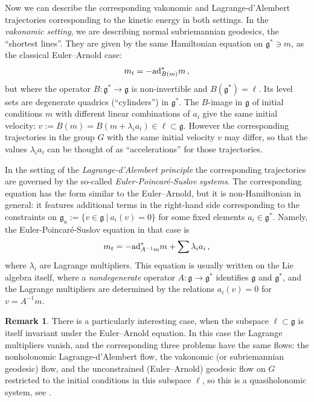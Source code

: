 \documentclass[11pt]{article}
\theoremstyle{definition}
\newtheorem{remark}[lemma]{Remark}
\newcounter{ai}
\begin{document}
Now we can describe the corresponding vakonomic and  Lagrange-d'Alembert trajectories corresponding to the 
kinetic energy in both settings.
In the {\it vakonomic setting}, we are describing normal subriemannian geodesics, the  ``shortest lines''. They are given by the same Hamiltonian equation on $\mathfrak{g}^*\ni m$, as the classical Euler--Arnold case:
$$
 m_t= -{\rm ad}^*_{B(m)}m\,,
 $$
 but where the operator $B: \mathfrak{g}^*\to\mathfrak{g}$ is non-invertible and $B(\mathfrak{g}^*)=\ell$.
 Its level sets are degenerate quadrics (``cylinders'') in $\mathfrak{g}^*$. The $B$-image in $\mathfrak{g}$ 
  of initial conditions $m$  with different linear combinations of $a_i$ give the same initial velocity:
  $v:=B(m)=B(m+\lambda_ia_i)\in \ell\subset \mathfrak{g}$. However the corresponding trajectories in the group $G$
 with the same initial velocity $v$ may differ, so that the values $\lambda_i a_i$ can be thought of as ``accelerations'' for those trajectories.
 
 \medskip
 

In the setting of the {\it Lagrange-d'Alembert principle} the corresponding trajectories are governed 
by the so-called {\it Euler-Poincar\'e-Suslov systems}. The corresponding equation has the form similar to the 
Euler--Arnold, but it is non-Hamiltonian in general: it features additional  terms in the right-hand side 
corresponding to the constraints on  $\mathfrak{g}_a:=\{v\in \mathfrak{g}~|~a_i(v)=0\}$ 
for some fixed elements $ a_i\in  \mathfrak{g}^*$. Namely, the Euler-Poincar\'e-Suslov equation 
in that case is
$$
    m_t= -{\rm ad}^*_{A^{-1}m}m+\sum\lambda_i a_i\,,
$$
where $\lambda_i$ are Lagrange multipliers.
This equation is usually written on the Lie algebra itself, where a {\it nondegenerate} operator $A:\mathfrak{g}\to \mathfrak{g}^*$ identifies $\mathfrak{g}$ and $\mathfrak{g}^*$, and  the Lagrange multipliers are determined by the relations $a_i(v)=0$ for $v=A^{-1}m$.

\begin{remark}\label{rem:coincide}
There is a particularly interesting case, when the subspace $\ell\subset \mathfrak{g}$
is itself invariant under the Euler--Arnold equation. In this case the Lagrange multipliers vanish, and 
the corresponding three problems have the same flows: the nonholonomic Lagrange-d'Alembert flow, the vakonomic (or subriemannian geodesic) flow, and the unconstrained (Euler--Arnold) geodesic flow on $G$ restricted to the initial conditions in this subspace $\ell$, so this is a quasiholonomic system, see \cite{jovanovic2001geometry,fedorov2006integrable}.
\end{remark}
\end{document}
